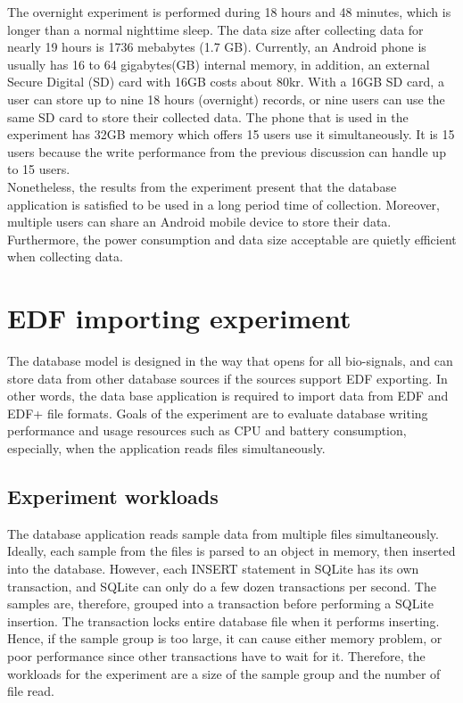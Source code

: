 The overnight experiment is performed during 18 hours and 48 minutes, which is longer than a normal nighttime sleep. The data size after collecting data for nearly 19 hours is 1736 mebabytes (1.7 GB). Currently, an Android phone is usually has 16 to 64 gigabytes(GB) internal memory, in addition, an external Secure Digital (SD) card with 16GB costs about 80kr. With a 16GB SD card, a user can store up to nine 18 hours (overnight) records, or nine users can use the same SD card to store their collected data. The phone that is used in the experiment has 32GB memory which offers 15 users use it simultaneously. It is 15 users because the write performance from the previous discussion can handle up to 15 users.\\
Nonetheless, the results from the experiment present that the database application is satisfied to be used in a long period time of collection. Moreover, multiple users can share an Android mobile device to store their data. Furthermore, the power consumption and data size acceptable are quietly efficient when collecting data.
\section{EDF importing experiment}
The database model is designed in the way that opens for all bio-signals, and can store data from other database sources if the sources support EDF exporting. In other words, the data base application is required to import data from EDF and EDF+ file formats. Goals of the experiment are to evaluate database writing performance and usage resources such as CPU and battery consumption, especially, when the application reads files simultaneously.
\subsection{Experiment workloads}
The database application reads sample data from multiple files simultaneously. Ideally, each sample from the files is parsed to an object in memory, then inserted into the database. However, each INSERT statement in SQLite has its own transaction, and SQLite can only do a few dozen transactions per second. The samples are, therefore, grouped into a transaction before performing a SQLite insertion. The transaction locks entire database file when it performs inserting. Hence, if the sample group is too large, it can cause either memory problem, or poor performance since other transactions have to wait for it. Therefore, the workloads for the experiment are a size of the sample group and the number of file read.
